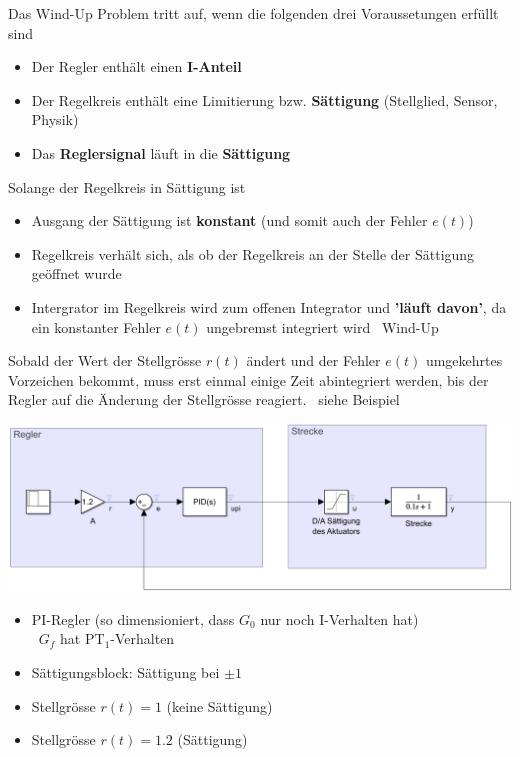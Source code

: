 Das Wind-Up Problem tritt auf, wenn die folgenden drei Voraussetungen erfüllt sind

\begin{itemize}
    \item Der Regler enthält einen \textbf{I-Anteil}
    \item Der Regelkreis enthält eine Limitierung bzw. \textbf{Sättigung} (Stellglied, Sensor, Physik)
    \item Das \textbf{Reglersignal} läuft in die \textbf{Sättigung}
\end{itemize}

\vspace{0.2cm}
Solange der Regelkreis in Sättigung ist

\begin{itemize}
    \item Ausgang der Sättigung ist \textbf{konstant} (und somit auch der Fehler $e(t)$)
    \item Regelkreis verhält sich, als ob der Regelkreis an der Stelle der Sättigung geöffnet wurde
    \item Intergrator im Regelkreis wird zum offenen Integrator und \textbf{'läuft davon'}, da ein konstanter Fehler $e(t)$ ungebremst
        integriert wird \textrightarrow\ Wind-Up
\end{itemize}

\vspace{0.2cm}
Sobald der Wert der Stellgrösse $r(t)$ ändert und der Fehler $e(t)$ umgekehrtes Vorzeichen bekommt, muss erst einmal einige Zeit
abintegriert werden, bis der Regler auf die Änderung der Stellgrösse reagiert. \textrightarrow\ siehe Beispiel



\begin{minipage}[c]{0.48\columnwidth}
    \includegraphics[width=\columnwidth]{images/windup_beispiel.png}
\end{minipage}
\hfill
\begin{minipage}[c]{0.48\columnwidth}
    \begin{itemize}
        \item PI-Regler (so dimensioniert, dass $G_0$ nur noch I-Verhalten hat) \\
            \textrightarrow\ $G_f$ hat $\text{PT}_1$-Verhalten
        \item Sättigungsblock: Sättigung bei $\pm 1$
        \item Stellgrösse $r(t) = 1$ (keine Sättigung)
        \item Stellgrösse $r(t) = 1.2$ (Sättigung)
    \end{itemize}
\end{minipage}


